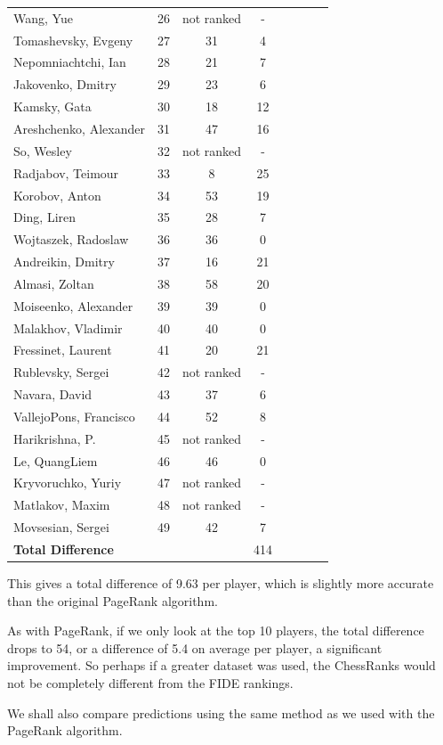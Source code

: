 \documentclass[pdftex,11pt,a4paper]{report}
\begin{document}
\begin{singlespace}
\begin{tabular}{l*{6}{c}r}
Wang, Yue & 26 & not ranked & -  \\ 
Tomashevsky, Evgeny & 27 & 31 & 4  \\ 
Nepomniachtchi, Ian & 28 & 21 & 7  \\ 
Jakovenko, Dmitry & 29 & 23 & 6  \\ 
Kamsky, Gata & 30 & 18 & 12  \\ 
Areshchenko, Alexander & 31 & 47 & 16  \\ 
So, Wesley & 32 & not ranked & -  \\ 
Radjabov, Teimour & 33 & 8 & 25  \\ 
Korobov, Anton & 34 & 53 & 19  \\ 
Ding, Liren & 35 & 28 & 7  \\ 
Wojtaszek, Radoslaw & 36 & 36 & 0  \\ 
Andreikin, Dmitry & 37 & 16 & 21  \\ 
Almasi, Zoltan & 38 & 58 & 20  \\ 
Moiseenko, Alexander & 39 & 39 & 0  \\ 
Malakhov, Vladimir & 40 & 40 & 0  \\ 
Fressinet, Laurent & 41 & 20 & 21  \\ 
Rublevsky, Sergei & 42 & not ranked & -  \\ 
Navara, David & 43 & 37 & 6  \\ 
VallejoPons, Francisco & 44 & 52 & 8  \\ 
Harikrishna, P. & 45 & not ranked & -  \\ 
Le, QuangLiem & 46 & 46 & 0  \\ 
Kryvoruchko, Yuriy & 47 & not ranked & -  \\ 
Matlakov, Maxim & 48 & not ranked & -  \\ 
Movsesian, Sergei & 49 & 42 & 7  \\ 
\textbf{Total Difference} & & & 414

\end{tabular}
\end{singlespace}

This gives a total difference of 9.63 per player, which is slightly more accurate than the original PageRank algorithm.

As with PageRank, if we only look at the top 10 players, the total difference drops to 54, or a difference of 5.4 on average per player, a significant
improvement. So perhaps if a greater dataset was used, the ChessRanks would not be completely different from the FIDE rankings.


We shall also compare predictions using the same method as we used with the PageRank algorithm.
\end{document}
